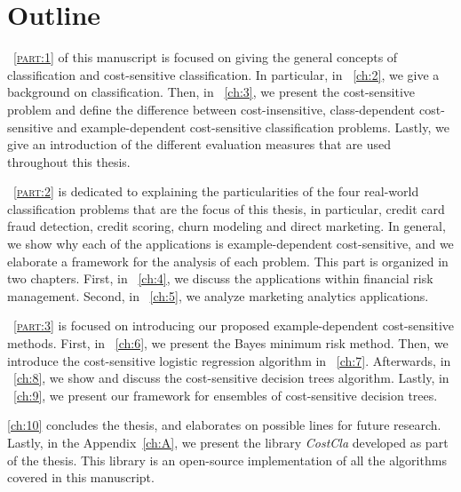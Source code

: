 \section{Outline}

\partname{~\textsc{\ref{part:1}}} of this manuscript is focused on giving the general concepts of 
classification and cost-sensitive classification. In particular, in \chaptername{~\ref{ch:2}}, we 
give a background on classification. Then, in \chaptername{~\ref{ch:3}}, we present 
the cost-sensitive problem and define the difference between 
cost-insensitive, class-dependent cost-sensitive and example-dependent cost-sensitive 
classification problems. Lastly, we give an introduction of the different evaluation measures 
that are used throughout this thesis.

\partname{~\textsc{\ref{part:2}}} is dedicated to explaining the particularities of the four 
real-world classification problems that are the focus of this thesis, in particular, credit card 
fraud detection, credit scoring, churn modeling and direct marketing. In general, we show why each 
of the applications is example-dependent cost-sensitive, and we elaborate a framework for the 
analysis of each problem. This part is organized in two chapters. First, in 
\chaptername{~\ref{ch:4}}, we discuss the applications within financial risk management. 
Second, in \chaptername{~\ref{ch:5}}, we analyze marketing analytics applications.

\partname{~\textsc{\ref{part:3}}} is focused on introducing our proposed example-dependent 
cost-sensitive methods. First, in \chaptername{~\ref{ch:6}}, we present the Bayes minimum risk 
method. Then, we introduce the cost-sensitive logistic regression algorithm in 
\chaptername{~\ref{ch:7}}. Afterwards, in \chaptername{~\ref{ch:8}}, we show and discuss the 
cost-sensitive decision trees algorithm. Lastly, in \chaptername{~\ref{ch:9}}, we present our 
framework for ensembles of cost-sensitive decision trees. 

\chaptername{ \ref{ch:10}} concludes the thesis, and elaborates on possible lines for future 
research. Lastly, in the Appendix~\ref{ch:A}, we present the library \mbox{\textit{CostCla}}  
developed as part of the thesis. This library is an open-source implementation of all the 
algorithms covered in this manuscript.
